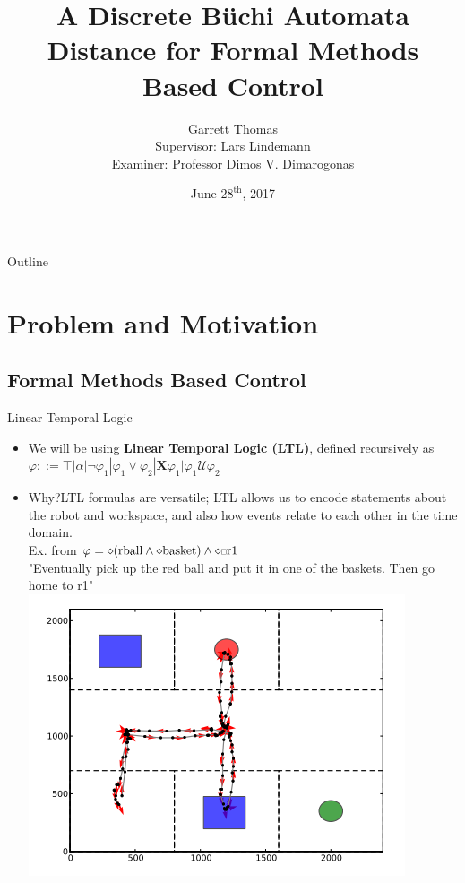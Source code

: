 \documentclass{beamer}
\title{A Discrete B\"uchi Automata Distance for Formal Methods Based Control}
\author{Garrett Thomas \\
Supervisor: Lars Lindemann \\
Examiner: Professor Dimos V. Dimarogonas}
\institute[Royal Institute of Technology, KTH] %
{
  Automatic Control Department \\
  Royal Institute of Technology, KTH}
\date{June $28^{\text{th}}$, 2017}
\newcommand{\ssquare}{\text{\scalebox{0.6}{$\square$}}}
\begin{document}
\begin{frame}
  \titlepage
\end{frame}

\begin{frame}{Outline}
  \tableofcontents
\end{frame}

\section{Problem and Motivation}

\subsection{Formal Methods Based Control}

\begin{frame}{Linear Temporal Logic}
  \begin{itemize}
  \item {
    We will be using \textbf{Linear Temporal Logic (LTL)}, defined recursively as
    $\varphi ::= \top | \alpha | \neg \varphi_1 | \varphi_1  \lor \varphi_2 | \textbf{X} \varphi_1 | \varphi_1 \bm{\mathcal{U}} \varphi_2$
    \pause
  }
  \item {
    Why?LTL formulas are versatile; LTL allows us to encode statements about the robot and workspace, and also how events relate to each other in the time domain. \\
    Ex. from \cite{guo15} $ \varphi= \diamond(\text{rball} \land \diamond \text{basket}) \land \diamond \ssquare \text{r1}$ \\
    "Eventually pick up the red ball and put it in one of the baskets. Then go home to r1" \\
     \centering\includegraphics[scale=0.3]{ltlExampleWorkspace}\par
  }
  \end{itemize}
\end{frame}
\end{document}
